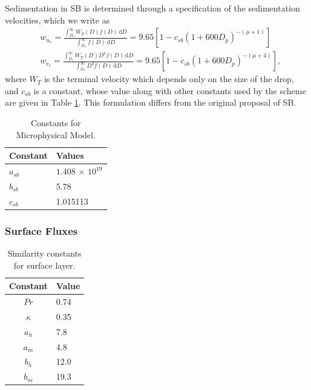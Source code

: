\documentclass[11pt,a4paper]{article}
\begin{document}
Sedimentation in SB is determined through a specification of the
sedimentation velocities, which we write as
\begin{align}
& w_{n_r} = \frac{\int_{D_*}^\infty W_T(D) f(D) \,
\mathrm{d}D}{\int_{D_*}^\infty f(D) \, \mathrm{d}D} = 9.65[1 -
c_{sb}(1+600 D_p)^{-(\mu+1)} ] \label{eq:wn} \\
& w_{r_r} = \frac{\int_{D_*}^\infty W_T(D) D^3 f(D) \,
\mathrm{d}D}{\int_{D_*}^\infty D^3 f(D) \, \mathrm{d}D} =
9.65[1 - c_{sb}(1 + 600 D_p)^{-(\mu+4)} ],
\label{eq:wr}
\end{align}
where $W_T$ is the terminal velocity which depends only on the size of
the drop, and $c_{sb}$ is a constant, whose value along with other
constants used by the scheme are given in Table \ref{tbl:SB}. This
formulation differs from the original proposal of SB.

\begin{table}[htb]
\begin{center}
\caption{Constants for Microphysical Model. \label{tbl:SB}}
\begin{tabular}{ll} \hline \hline
Constant  & Values \\ \hline
$a_{sb}$  & $1.408 \, \times \, 10^{19}$ \\
$b_{sb}$  & 5.78 \\
$c_{sb}$  & 1.015113 \\ 
\end{tabular}
\end{center}
\end{table}

\subsubsection{Surface Fluxes}

\begin{table}[htb]
\caption{Similarity constants for surface layer.} \label{tbl:surface}
\begin{center}
\begin{tabular}{cl} \hline \hline
Constant & Value  \\ \hline
$Pr$       & 0.74 \\
$\kappa$   & 0.35 \\
$a_h$      & 7.8  \\
$a_m$      & 4.8  \\
$b_h$      & 12.0 \\
$b_m$      & 19.3 \\ \hline
\end{tabular}
\end{center}
\end{table}
\end{document}
